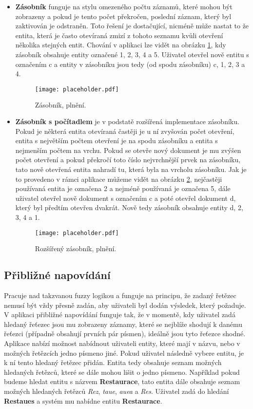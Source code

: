 \begin{itemize}
  \item \textbf{Zásobník} funguje na stylu omezeného počtu záznamů, které mohou být zobrazeny a pokud je tento počet překročen, poslední záznam, který byl zaktivován je odstraněn. Toto řešení je dostačující, nicméně může nastat to že entita, která je často otevíraná zmizí z tohoto seznamu kvůli otevření několika stejných entit. Chování v aplikaci lze vidět na obrázku \ref{zasobnik}, kdy zásobník obsahuje entity označené 1, 2, 3, 4 a 5. Uživatel otevřel nově entitu s označením c a entity v zásobníku jsou tedy (od spodu zásobníku) c, 1, 2, 3 a 4.
\begin{figure}[htp]
  \centering
  \texttt{[image: placeholder.pdf]}
  \caption{Zásobník, plnění.}
  \label{zasobnik}
\end{figure}
  \item \textbf{Zásobník s počítadlem} je v podstatě rozšířená implementace zásobníku. Pokud je některá entita otevíraná častěji je u ní zvyšován počet otevření, entita s největším počtem otevření je na spodu zásobníku a entita s nejmenším počtem na vrchu. Pokud se otevře nový dokument je mu zvýšen počet otevření a pokud překročí toto číslo nejvrchnější prvek na zásobníku, tato nově otevřená entita nahradí tu, která byla na vrcholu zásobníku. Jak je to provedeno v rámci aplikace můžeme vidět na obrázku \ref{counter}, nejčastěji používaná entita je označena 2 a nejméně používaná je označena 5, dále uživatel otevřel nově dokument s označením c a poté otevřel dokument d, který byl předtím otevřen dvakrát. Nově tedy zásobník obsahuje entity d, 2, 3, 4 a 1.
\begin{figure}[htp]
  \centering
  \texttt{[image: placeholder.pdf]}
  \caption{Rozšířený zásobník, plnění.}
  \label{counter}
\end{figure}
\end{itemize}

\subsection{Přibližné napovídání}
\par Pracuje nad takzvanou fuzzy logikou a funguje na principu, že zadaný řetězec nemusí být vždy přesně zadán, aby uživateli byl dodán výsledek, který požaduje. V aplikaci přibližné napovídání funguje tak, že v momentě, kdy uživatel zadá hledaný řeťezec jsou mu zobrazeny záznamy, které se nejblíže shodují k danému řeťezci (případně obsahují prvních pár písmen), ideálně jsou tyto řeťezce shodné. Aplikace nabízí možnost nabídnout uživateli entity, které mají v názvu, nebo v možných řetězcích jedno písmeno jiné. Pokud uživatel následně vybere entitu, je k ní tento hledaný řetězec přidán. Entita tedy obsahuje seznam možných hledaných řetězců, které se dále mohou lišit o jedno písmeno. Například pokud budeme hledat entitu s názvem \textbf{Restaurace}, tato entita dále obsahuje seznam možných hledaných řetězců \textit{Rez}, \textit{taue}, \textit{auea} a \textit{Res}. Uživatel zadá do hledání \textbf{Restaues} a systém mu nabídne entitu \textbf{Restaurace}.

